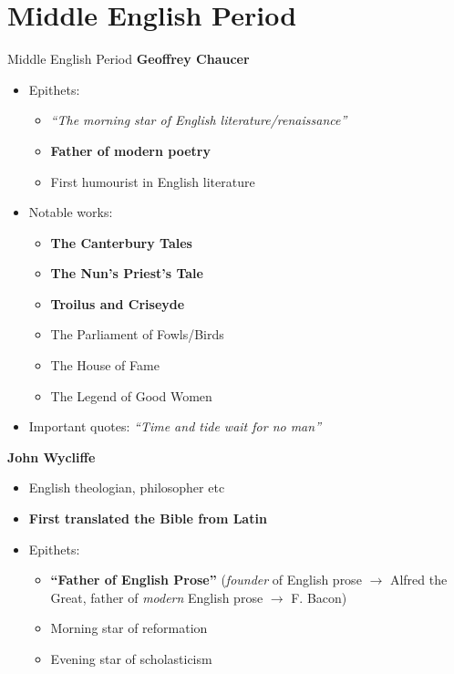 \documentclass[
  12pt,
    progressbar=frametitle]{beamer}
\providecommand{\tightlist}{%
  \setlength{\itemsep}{0pt}\setlength{\parskip}{0pt}}
\begin{document}
\section{Middle English Period}
\begin{frame}[allowframebreaks]
{Middle English Period}
\large\textbf{Geoffrey Chaucer}\normalsize\vspace{-3mm}

\begin{itemize}
\tightlist
\item
  Epithets:

  \begin{itemize}
  \tightlist
  \item
    \emph{``The morning star of English literature/renaissance''}
  \item
    \textbf{Father of modern poetry}
  \item
    First humourist in English literature
  \end{itemize}
\item
  Notable works:

  \begin{itemize}
  \tightlist
  \item
    \textbf{The Canterbury Tales}
  \item
    \textbf{The Nun's Priest's Tale}
  \item
    \textbf{Troilus and Criseyde}
  \item
    The Parliament of Fowls/Birds
  \item
    The House of Fame
  \item
    The Legend of Good Women
  \end{itemize}
\item
  Important quotes: \emph{``Time and tide wait for no man''}
\end{itemize}

\large\textbf{John Wycliffe}\normalsize\vspace{-3mm}

\begin{itemize}
\tightlist
\item
  English theologian, philosopher etc
\item
  \textbf{First translated the Bible from Latin}
\item
  Epithets:

  \begin{itemize}
  \tightlist
  \item
    \textbf{``Father of English Prose''} (\emph{founder} of English
    prose \(\rightarrow\) Alfred the Great, father of \emph{modern}
    English prose \(\rightarrow\) F. Bacon)
  \item
    Morning star of reformation
  \item
    Evening star of scholasticism
  \end{itemize}
\end{itemize}


\end{frame}
\end{document}
